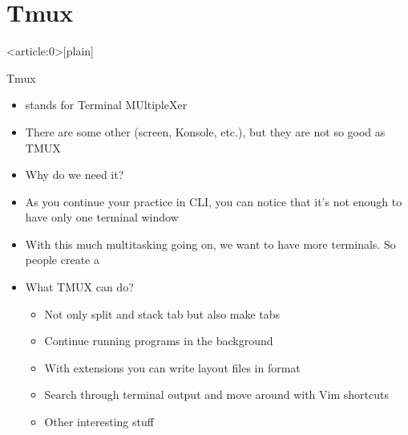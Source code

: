 \documentclass[usenames,dvipsnames,10pt,aspectratio=169]{beamer}
\begin{document}
\section{Tmux}
{ %
    \begin{frame}<article:0>[plain]
     \end{frame}
}

\begin{frame}{Tmux}
    \begin{itemize}
        \item {} stands for Terminal MUltipleXer
        \item There are some other (screen, Konsole, etc.), but they are not so good as TMUX
        \item Why do we need it?
        \item As you continue your practice in CLI, you can notice that it's not enough to have only one terminal window
        \item With this much multitasking going on, we want to have more terminals. So people create a 
        \item What TMUX can do?
        \begin{itemize}
            \item Not only split and stack tab but also make tabs
            \item Continue running programs in the background
            \item With extensions you can write layout files in  format
            \item Search through terminal output and move around with Vim shortcuts
            \item Other interesting stuff
        \end{itemize}
    \end{itemize}
\end{frame}
\end{document}
